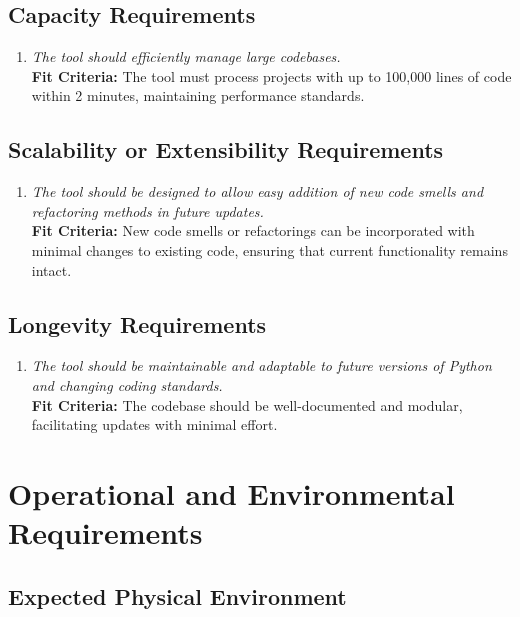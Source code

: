 \documentclass[12pt]{article}
\begin{document}
\subsection{Capacity Requirements}
\begin{enumerate}[label=PR-CAP \arabic*., wide=0pt, leftmargin=*]
  \item \emph{The tool should efficiently manage large codebases.}\\
  {\bf Fit Criteria:} The tool must process projects with up to 100,000 lines of code within 2 minutes, maintaining performance standards.
\end{enumerate}

\subsection{Scalability or Extensibility Requirements}
\begin{enumerate}[label=PR-SCE \arabic*., wide=0pt, leftmargin=*]
  \item \emph{The tool should be designed to allow easy addition of new code smells and refactoring methods in future updates.}\\
  {\bf Fit Criteria:} New code smells or refactorings can be incorporated with minimal changes to existing code, ensuring that current functionality remains intact.
\end{enumerate}

\subsection{Longevity Requirements}
\begin{enumerate}[label=PR-LGT \arabic*., wide=0pt, leftmargin=*]
  \item \emph{The tool should be maintainable and adaptable to future versions of Python and changing coding standards.}\\
  {\bf Fit Criteria:} The codebase should be well-documented and modular, facilitating updates with minimal effort.
\end{enumerate}

\section{Operational and Environmental Requirements}
\subsection{Expected Physical Environment}
\end{document}

